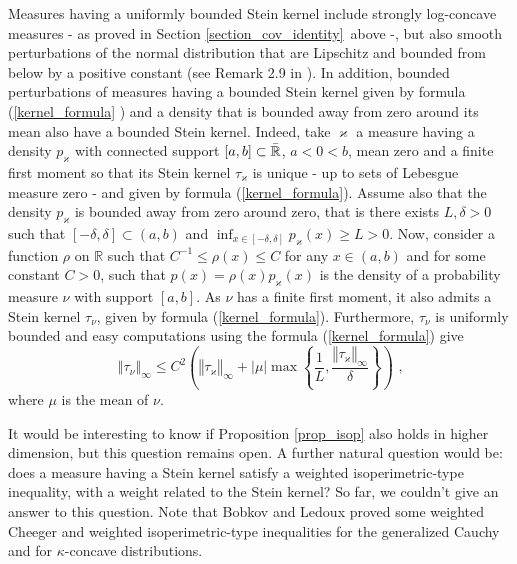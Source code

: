 \documentclass[11pt]{article}
\begin{document}
Measures having a uniformly bounded Stein kernel include strongly
log-concave measures - as proved in Section \ref{section_cov_identity}\
above -, but also smooth perturbations of the normal distribution that are
Lipschitz and bounded from below by a positive constant (see Remark 2.9 in 
\cite{LedoucNourdinPeccati:15}). In addition, bounded perturbations of
measures having a bounded Stein kernel given by formula (\ref{kernel_formula}%
) and a density that is bounded away from zero around its mean also have a
bounded Stein kernel. Indeed, take $\varkappa $ a measure having a density $%
p_{\varkappa }$ with connected support $\left[ a,b\right] \subset \mathbb{%
\bar{R}}$, $a<0<b$, mean zero and a finite first moment so that its Stein
kernel $\tau _{\varkappa }$ is unique - up to sets of Lebesgue measure zero
- and given by formula (\ref{kernel_formula}). Assume also that the density $%
p_{\varkappa }$ is bounded away from zero around zero, that is there exists $%
L,\delta >0$ such that $\left[ -\delta ,\delta \right] \subset \left(
a,b\right) $ and $\inf_{x\in \left[ -\delta ,\delta \right] }p_{\varkappa
}\left( x\right) \geq L>0$. Now, consider a function $\rho $ on $\mathbb{R}$
such that $C^{-1}\leq \rho \left( x\right) \leq C$ for any $x\in \left(
a,b\right) $ and for some constant $C>0$, such that $p\left( x\right) =\rho
\left( x\right) p_{\varkappa }\left( x\right) $ is the density of a
probability measure $\nu $ with support $\left[ a,b\right] $. As $\nu $ has
a finite first moment, it also admits a Stein kernel $\tau _{\nu }$, given
by formula (\ref{kernel_formula}). Furthermore, $\tau _{\nu }$ is uniformly
bounded and easy computations using the formula (\ref{kernel_formula}) give%
\begin{equation*}
\left\Vert \tau _{\nu }\right\Vert _{\infty }\leq C^{2}\left( \left\Vert
\tau _{\varkappa }\right\Vert _{\infty }+\left\vert \mu \right\vert \max
\left\{ \frac{1}{L},\frac{\left\Vert \tau _{\varkappa }\right\Vert _{\infty }%
}{\delta }\right\} \right) \text{ ,}
\end{equation*}%
where $\mu $ is the mean of $\nu $.

It would be interesting to know if Proposition \ref{prop_isop} also holds in
higher dimension, but this question remains open. A further natural question
would be: does a measure having a Stein kernel satisfy a weighted
isoperimetric-type inequality, with a weight related to the Stein kernel? So
far, we couldn't give an answer to this question. Note that Bobkov and
Ledoux 
\cite{MR2797936, MR2510011}
proved some weighted Cheeger and weighted isoperimetric-type inequalities
for the generalized Cauchy and for $\kappa $-concave distributions.
\end{document}
